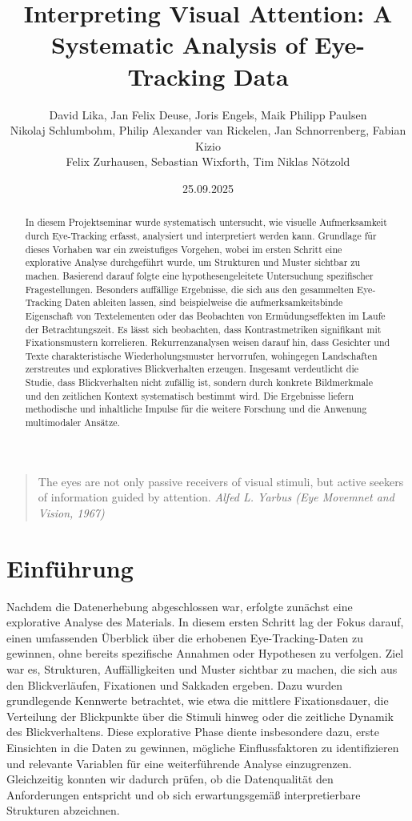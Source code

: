 \documentclass[
    language=german, %
    thesis=seminar, %
    supervisor=postdoc, %
    multiauthor=true, %
    ]{settings/csssa-thesis}
\title{Interpreting Visual Attention: A Systematic Analysis of Eye-Tracking Data}
\author{David Lika, Jan Felix Deuse, Joris Engels, Maik Philipp Paulsen \\
 Nikolaj Schlumbohm, Philip Alexander van Rickelen, Jan Schnorrenberg, Fabian Kizio \\
 Felix Zurhausen, Sebastian Wixforth, Tim Niklas Nötzold}
\date{25.09.2025}
\begin{document}
\maketitlepage
\maketitle

\begin{quote}
    The eyes are not only passive receivers of visual stimuli, but active seekers of information guided by attention.
    {\textit{Alfed L. Yarbus (Eye Movemnet and Vision, 1967)}}
\end{quote}

\begin{abstract}
In diesem Projektseminar wurde systematisch untersucht, wie visuelle Aufmerksamkeit durch Eye-Tracking erfasst, analysiert und interpretiert werden kann. Grundlage für dieses Vorhaben war ein zweistufiges Vorgehen, wobei im ersten Schritt eine explorative Analyse durchgeführt wurde, um Strukturen und Muster sichtbar zu machen. Basierend darauf folgte eine hypothesengeleitete Untersuchung spezifischer Fragestellungen. Besonders auffällige Ergebnisse, die sich aus den gesammelten Eye-Tracking Daten ableiten lassen, sind beispielweise die aufmerksamkeitsbinde Eigenschaft von Textelementen oder das Beobachten von Ermüdungseffekten im Laufe der Betrachtungszeit. Es lässt sich beobachten, dass Kontrastmetriken signifikant mit Fixationsmustern korrelieren. Rekurrenzanalysen weisen darauf hin, dass Gesichter und Texte charakteristische Wiederholungsmuster hervorrufen, wohingegen Landschaften zerstreutes und exploratives Blickverhalten erzeugen. Insgesamt verdeutlicht die Studie, dass Blickverhalten nicht zufällig ist, sondern durch konkrete Bildmerkmale und den zeitlichen Kontext systematisch bestimmt wird. Die Ergebnisse liefern methodische und inhaltliche Impulse für die weitere Forschung und die Anwenung multimodaler Ansätze.  
\end{abstract}



\section{Einführung}

Nachdem die Datenerhebung abgeschlossen war, erfolgte zunächst eine explorative Analyse des Materials.
In diesem ersten Schritt lag der Fokus darauf, einen umfassenden Überblick über die erhobenen Eye-Tracking-Daten zu gewinnen,
ohne bereits spezifische Annahmen oder Hypothesen zu verfolgen. 
Ziel war es, Strukturen, Auffälligkeiten und Muster sichtbar zu machen, die sich aus den Blickverläufen,
Fixationen und Sakkaden ergeben. Dazu wurden grundlegende Kennwerte betrachtet, wie etwa die mittlere Fixationsdauer,
die Verteilung der Blickpunkte über die Stimuli hinweg oder die zeitliche Dynamik des Blickverhaltens.
Diese explorative Phase diente insbesondere dazu, erste Einsichten in die Daten zu gewinnen,
mögliche Einflussfaktoren zu identifizieren und relevante Variablen für eine weiterführende Analyse einzugrenzen.
Gleichzeitig konnten wir dadurch prüfen, ob die Datenqualität den Anforderungen entspricht und ob sich erwartungsgemä{\ss}
interpretierbare Strukturen abzeichnen. 
\end{document}
